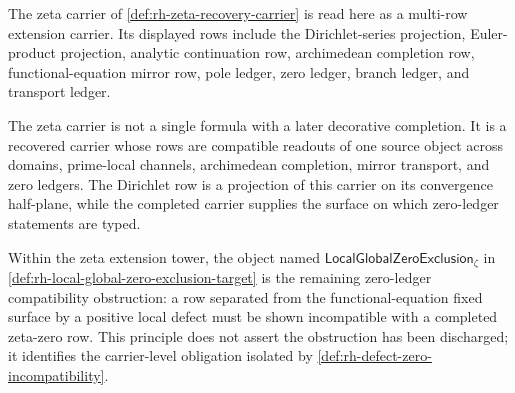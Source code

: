 \begin{definition}
\label{def:zeta-recovered-extension-carrier}
The zeta carrier of \autoref{def:rh-zeta-recovery-carrier} is read here
as a multi-row extension carrier. Its displayed rows include the
Dirichlet-series projection, Euler-product projection, analytic
continuation row, archimedean completion row, functional-equation mirror
row, pole ledger, zero ledger, branch ledger, and transport ledger.
\end{definition}

\begin{principle}
\label{prin:zeta-extension-tower}
The zeta carrier is not a single formula with a later decorative
completion. It is a recovered carrier whose rows are compatible readouts
of one source object across domains, prime-local channels, archimedean
completion, mirror transport, and zero ledgers. The Dirichlet row is a
projection of this carrier on its convergence half-plane, while the
completed carrier supplies the surface on which zero-ledger statements
are typed.
\end{principle}

\begin{principle}
\label{prin:rh-target-extension-compatibility-obstruction}
Within the zeta extension tower, the object named
$\mathsf{LocalGlobalZeroExclusion}_{\zeta}$ in
\autoref{def:rh-local-global-zero-exclusion-target} is the remaining
zero-ledger compatibility obstruction: a row separated from the
functional-equation fixed surface by a positive local defect must be
shown incompatible with a completed zeta-zero row. This principle does
not assert the obstruction has been discharged; it identifies the
carrier-level obligation isolated by
\autoref{def:rh-defect-zero-incompatibility}.
\end{principle}

